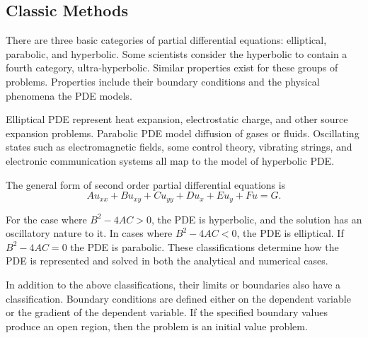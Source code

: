 \subsection {Classic Methods}
There are three basic %
categories of partial differential equations: elliptical, parabolic, and hyperbolic.  Some scientists consider the hyperbolic to %
contain a fourth category, ultra-hyperbolic.  %
Similar properties exist for these groups of problems.  Properties include their boundary conditions and the physical phenomena the PDE models.  %

Elliptical PDE represent %
heat expansion, electrostatic charge, and other source expansion problems.  Parabolic PDE model diffusion of gases or fluids.  Oscillating states such as electromagnetic fields, some control theory, vibrating strings, and electronic communication systems all map to the model of hyperbolic PDE.%

The general form of second order partial differential equations is %
\begin {equation}
Au_{xx} + Bu_{xy} +Cu_{yy} +Du_{x} + Eu_{y} + Fu = G.
\end {equation}

For the case where $B^2 - 4AC > 0 $, %
the PDE is hyperbolic, and the solution has an oscillatory nature to it.  In cases where  $B^2 - 4AC < 0 $,  %
the PDE is elliptical.  If $B^2-4AC =  0$ %
the PDE is parabolic.  These classifications determine how the PDE is represented and solved in both the analytical and numerical cases.  %


In addition to the above classifications, %
their limits or boundaries also have a classification.   Boundary conditions are defined either on the dependent variable or the gradient of the dependent variable.  If %
the specified boundary values produce an open region,  %
then the problem is an initial value problem.   %


